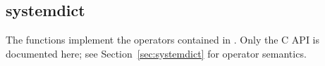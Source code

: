 %
%
%
%
%

\subsection{systemdict}
\label{systemdict}

The  functions implement the operators contained in
.  Only the C API is documented here; see
Section~\ref{sec:systemdict} for operator semantics.

